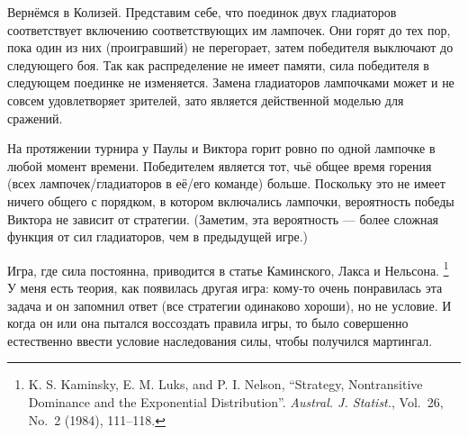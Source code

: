 Вернёмся в Колизей.
Представим себе, что поединок двух гладиаторов соответствует включению соответствующих им лампочек.
Они горят до тех пор, пока один из них (проигравший) не перегорает, затем победителя выключают до следующего боя.
Так как распределение не имеет памяти, сила победителя в следующем поединке не изменяется.
Замена гладиаторов лампочками может и не совсем удовлетворяет зрителей, зато является действенной моделью для сражений.

На протяжении турнира у Паулы и Виктора горит ровно по одной лампочке в любой момент времени.
Победителем является тот, чьё общее время горения (всех лампочек/гладиаторов в её/его команде) больше.
Поскольку это не имеет ничего общего с порядком, в котором включались лампочки, вероятность победы Виктора не зависит от стратегии.
(Заметим, эта вероятность --- более сложная функция от сил гладиаторов, чем в предыдущей игре.)
\heart

Игра, где сила постоянна, приводится в статье Каминского, Лакса и Нельсона.%
\footnote{K. S. Kaminsky, E. M. Luks, and P. I. Nelson, ``Strategy, Nontransitive Dominance and the Exponential Distribution''. \emph{Austral. J. Statist.}, Vol.~26, No.~2 (1984), 111--118.}
У меня есть теория, как появилась другая игра: кому-то очень понравилась эта задача и он запомнил ответ (все стратегии одинаково хороши), но не условие.
И когда он или она пытался воссоздать правила игры, то было совершенно естественно ввести условие наследования силы, чтобы получился мартингал.
